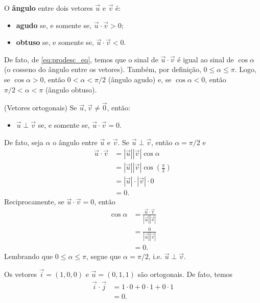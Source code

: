 \begin{obs}
  O {\bf ângulo} entre dois vetores $\vec{u}$ e $\vec{v}$ é:
  \begin{itemize}
  \item {\bf agudo} se, e somente se, $\vec{u}\cdot\vec{v} > 0$;
  \item {\bf obtuso} se, e somente se, $\vec{u}\cdot\vec{v} < 0$.
  \end{itemize}

  De fato, de \eqref{eq:prodesc_eq}, temos que o sinal de $\vec{u}\cdot\vec{v}$ é igual ao sinal de $\cos\alpha$ (o cosseno do ângulo entre os vetores). Também, por definição, $0 \leq \alpha \leq \pi$. Logo, se $\cos\alpha > 0$, então $0< \alpha < \pi/2$ (ângulo agudo) e, se $\cos\alpha < 0$, então $\pi/2 < \alpha < \pi$ (ângulo obtuso).
\end{obs}

\begin{obs}(Vetores ortogonais) 
  Se $\vec{u},\vec{v}\neq\vec{0}$, então:
  \begin{itemize}
  \item $\vec{u}\perp\vec{v}$ se, e somente se, $\vec{u}\cdot\vec{v}=0$.
  \end{itemize}

  De fato, seja $\alpha$ o ângulo entre $\vec{u}$ e $\vec{v}$. Se $\vec{u}\perp\vec{v}$, então $\alpha = \pi/2$ e
  \begin{align}
    \vec{u}\cdot\vec{v} &= |\vec{u}||\vec{v}|\cos\alpha\\
                        &= |\vec{u}||\vec{v}|\cos\left(\frac{\pi}{2}\right)\\
                        &= |\vec{u}|\cdot |\vec{v}|\cdot 0 \\
                        &= 0.
  \end{align}
  Reciprocamente, se $\vec{u}\cdot\vec{v} = 0$, então
  \begin{align}
    \cos\alpha &= \frac{\vec{u}\cdot\vec{v}}{|\vec{u}||\vec{v}|}\\
               &= \frac{0}{|\vec{u}||\vec{v}|} \\
               &= 0.
  \end{align}
  Lembrando que $0\leq \alpha\leq \pi$, segue que $\alpha = \pi/2$, i.e. $\vec{u}\perp\vec{v}$.
\end{obs}

\begin{ex}
  Os vetores $\vec{i}=(1,0,0)$ e $\vec{u}=(0,1,1)$ são ortogonais. De fato, temos
  \begin{align}
    \vec{i}\cdot\vec{j} &= 1\cdot 0 + 0\cdot 1 + 0\cdot 1 \\
                        &= 0.
  \end{align}
\end{ex}

